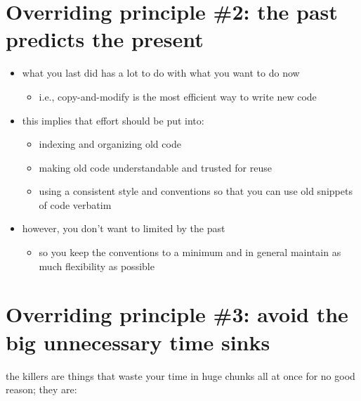 \section*{Overriding principle \#2: the past predicts the present}
\begin{itemize}
\item what you last did has a lot to do with what you want to do now

	\begin{itemize}
	\item i.e., copy-and-modify is the most efficient way to write new code
	\end{itemize}

\item this implies that effort should be put into:

	\begin{itemize}
	\item indexing and organizing old code
	\item making old code understandable and trusted for reuse
	\item using a consistent style and conventions so that you can use old 
		snippets of code verbatim
	\end{itemize}

\item however, you don't want to limited by the past

	\begin{itemize}
	\item so you keep the conventions
		to a minimum and in general maintain as much flexibility as possible
	\end{itemize}

\end{itemize}

\section*{Overriding principle \#3: avoid the big unnecessary time sinks}

	the killers are things that waste your time in huge chunks all at once for
	no good reason;
	they are:

